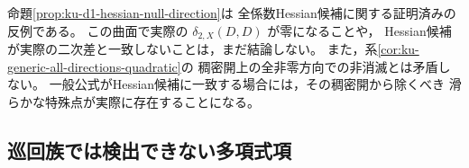 \begin{remark}[候補の反例と実際の二次差]
\label{rem:ku-d1-hessian-null-scope}
命題\ref{prop:ku-d1-hessian-null-direction}は
全係数Hessian候補に関する証明済みの反例である。
この曲面で実際の $\delta_{2,X}(D,D)$ が零になることや，
Hessian候補が実際の二次差と一致しないことは，まだ結論しない。
また，系\ref{cor:ku-generic-all-directions-quadratic}の
稠密開上の全非零方向での非消滅とは矛盾しない。
一般公式がHessian候補に一致する場合には，その稠密開から除くべき
滑らかな特殊点が実際に存在することになる。
\end{remark}

\subsection{巡回族では検出できない多項式項}

